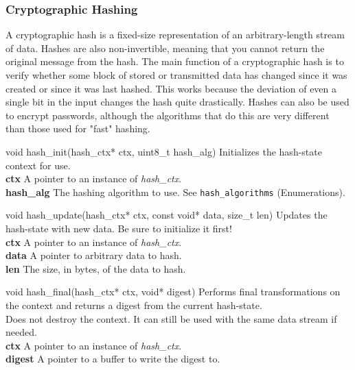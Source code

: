 \documentclass[titlepage]{article}
\begin{document}
		\subsubsection{Cryptographic Hashing}
			A cryptographic hash is a fixed-size representation of an arbitrary-length stream of data. Hashes are also non-invertible, meaning that you cannot return the original message from the hash. The main function of a cryptographic hash is to verify whether some block of stored or transmitted data has changed since it was created or since it was last hashed. This works because the deviation of even a single bit in the input changes the hash quite drastically. Hashes can also be used to encrypt passwords, although the algorithms that do this are very different than those used for "fast" hashing.
			\begin{functionspec}[]{void hash\_init(hash\_ctx* ctx, uint8\_t hash\_alg)}
				Initializes the hash-state context for use.\\
				\textbf{ctx} A pointer to an instance of \textit{hash\_ctx}.\\
				\textbf{hash\_alg} The hashing algorithm to use. See \texttt{hash\_algorithms} (Enumerations).
			\end{functionspec}
			\vspace{1mm}
			\begin{functionspec}[]{void hash\_update(hash\_ctx* ctx, const void* data, size\_t len)}
				Updates the hash-state with new data. Be sure to initialize it first!\\
				\textbf{ctx} A pointer to an instance of \textit{hash\_ctx}.\\
				\textbf{data} A pointer to arbitrary data to hash.\\
				\textbf{len} The size, in bytes, of the data to hash.
			\end{functionspec}
			\vspace{1mm}
			\begin{functionspec}[]{void hash\_final(hash\_ctx* ctx, void* digest)}
				Performs final transformations on the context and returns a digest from the current hash-state.\\
				Does not destroy the context. It can still be used with the same data stream if needed.\\
				\textbf{ctx} A pointer to an instance of \textit{hash\_ctx}.\\
				\textbf{digest} A pointer to a buffer to write the digest to.
			\end{functionspec}
			
\end{document}

